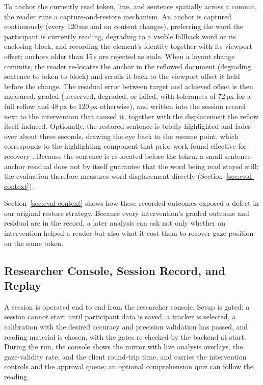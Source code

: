 To anchor the currently read token, line, and sentence spatially across a commit, the reader runs a capture-and-restore mechanism.
An anchor is captured continuously (every 120\,ms and on content changes), preferring the word the participant is currently reading, degrading to a visible fallback word or its enclosing block, and recording the element's identity together with its viewport offset; anchors older than 15\,s are rejected as stale.
When a layout change commits, the reader re-locates the anchor in the reflowed document (degrading sentence to token to block) and scrolls it back to the viewport offset it held before the change.
The residual error between target and achieved offset is then measured, graded (preserved, degraded, or failed, with tolerances of 72\,px for a full reflow and 48\,px to 120\,px otherwise), and written into the session record next to the intervention that caused it, together with the displacement the reflow itself induced.
Optionally, the restored sentence is briefly highlighted and fades over about three seconds, drawing the eye back to the resume point, which corresponds to the highlighting component that prior work found effective for recovery \cite{jensen2025context}.
Because the sentence is re-located before the token, a small sentence-anchor residual does not by itself guarantee that the word being read stayed still; the evaluation therefore measures word displacement directly (Section~\ref{sec:eval-context}).

Section~\ref{sec:eval-context} shows how these recorded outcomes exposed a defect in our original restore strategy.
Because every intervention's graded outcome and residual are in the record, a later analysis can ask not only whether an intervention helped a reader but also what it cost them to recover gaze position on the same token.

\subsection{Researcher Console, Session Record, and Replay}
\label{sec:platform-record}

A session is operated end to end from the researcher console.
Setup is gated: a session cannot start until participant data is saved, a tracker is selected, a calibration with the desired accuracy and precision validation has passed, and reading material is chosen, with the gates re-checked by the backend at start.
During the run, the console shows the mirror with live analysis overlays, the gaze-validity rate, and the client round-trip time, and carries the intervention controls and the approval queue; an optional comprehension quiz can follow the reading.

